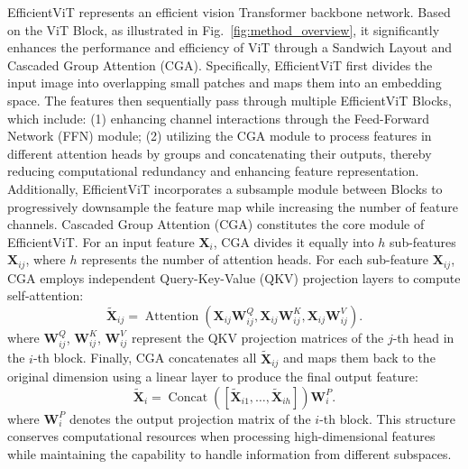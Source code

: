 \documentclass[a4paper,fleqn]{cas-sc}
\begin{document}
EfficientViT \citep{liu2023efficientvit} represents an efficient vision Transformer \citep{dosovitskiy2020image} backbone network. Based on the ViT Block, as illustrated in Fig.~\ref{fig:method_overview}, it significantly enhances the performance and efficiency of ViT through a Sandwich Layout and Cascaded Group Attention (CGA). Specifically, EfficientViT first divides the input image into overlapping small patches and maps them into an embedding space. The features then sequentially pass through multiple EfficientViT Blocks, which include: (1) enhancing channel interactions through the Feed-Forward Network (FFN) module; (2) utilizing the CGA module to process features in different attention heads by groups and concatenating their outputs, thereby reducing computational redundancy and enhancing feature representation. Additionally, EfficientViT incorporates a subsample module between Blocks to progressively downsample the feature map while increasing the number of feature channels. Cascaded Group Attention (CGA) constitutes the core module of EfficientViT. For an input feature $\mathbf{X}_i$, CGA divides it equally into $h$ sub-features $\mathbf{X}_{ij}$, where $h$ represents the number of attention heads. For each sub-feature $\mathbf{X}_{ij}$, CGA employs independent Query-Key-Value (QKV) projection layers to compute self-attention:
\begin{equation}
	\tilde{\mathbf{X}}_{ij} = \operatorname{Attention}(\mathbf{X}_{ij}\mathbf{W}^Q_{ij}, \mathbf{X}_{ij}\mathbf{W}^K_{ij}, \mathbf{X}_{ij}\mathbf{W}^V_{ij}).
\end{equation}
where $\mathbf{W}^Q_{ij}$, $\mathbf{W}^K_{ij}$, $\mathbf{W}^V_{ij}$ represent the QKV projection matrices of the $j$-th head in the $i$-th block. Finally, CGA concatenates all $\tilde{\mathbf{X}}_{ij}$ and maps them back to the original dimension using a linear layer to produce the final output feature:
\begin{equation}
	\tilde{\mathbf{X}}_i = \operatorname{Concat}([\tilde{\mathbf{X}}_{i1}, \ldots, \tilde{\mathbf{X}}_{ih}])\mathbf{W}^P_i.
\end{equation}
where $\mathbf{W}^P_i$ denotes the output projection matrix of the $i$-th block. This structure conserves computational resources when processing high-dimensional features while maintaining the capability to handle information from different subspaces.
\end{document}
